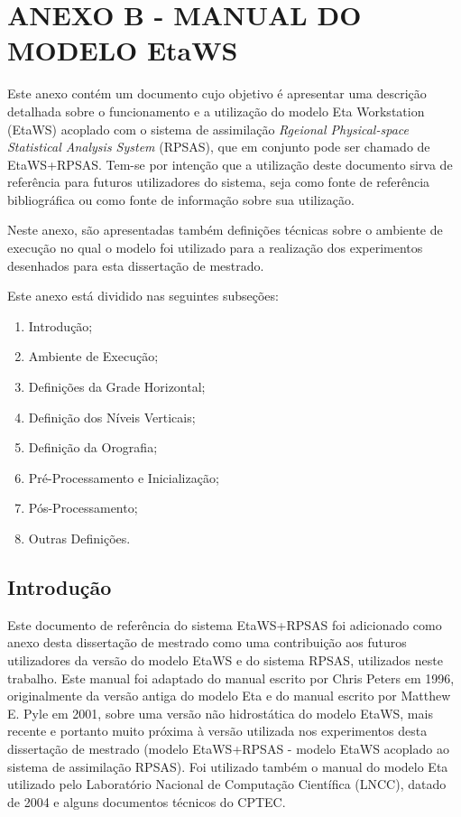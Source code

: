 \hypertarget{estilo:anexo}{}

\chapter{ANEXO B - MANUAL DO MODELO EtaWS}
\label{anexoB}

Este anexo contém um documento cujo objetivo é apresentar uma descrição detalhada sobre o funcionamento e a utilização do modelo Eta Workstation (EtaWS) acoplado com o sistema de assimilação \textit{Rgeional Physical-space Statistical Analysis System} (RPSAS), que em conjunto pode ser chamado de EtaWS+RPSAS. Tem-se por intenção que a utilização deste documento sirva de referência para futuros utilizadores do sistema, seja como fonte de referência bibliográfica ou como fonte de informação sobre sua utilização. 

Neste anexo, são apresentadas também definições técnicas sobre o ambiente de execução no qual o modelo foi utilizado para a realização dos experimentos desenhados para esta dissertação de mestrado.

Este anexo está dividido nas seguintes subseções:

\begin{enumerate}
\item Introdução;
\item Ambiente de Execução;
\item Definições da Grade Horizontal;
\item Definição dos Níveis Verticais;
\item Definição da Orografia;
\item Pré-Processamento e Inicialização;
\item Pós-Processamento;
\item Outras Definições.
\end{enumerate}

\section{Introdução}
\label{ss:introeta}

Este documento de referência do sistema EtaWS+RPSAS foi adicionado como anexo desta dissertação de mestrado como uma contribuição aos futuros utilizadores da versão do modelo EtaWS e do sistema RPSAS, utilizados neste trabalho. Este manual foi adaptado do manual escrito por Chris Peters em 1996, originalmente da versão antiga do modelo Eta e do manual escrito por Matthew E. Pyle em 2001, sobre uma versão não hidrostática do modelo EtaWS, mais recente e portanto muito próxima à versão utilizada nos experimentos desta dissertação de mestrado (modelo EtaWS+RPSAS - modelo EtaWS acoplado ao sistema de assimilação RPSAS). Foi utilizado também o manual do modelo Eta utilizado pelo Laboratório Nacional de Computação Científica (LNCC), datado de 2004 e alguns documentos técnicos do CPTEC.

